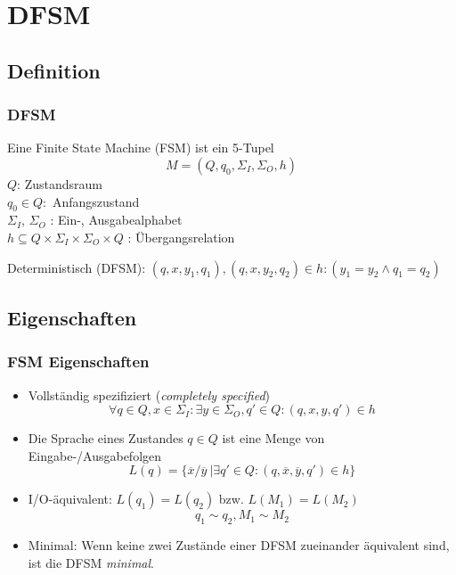 \section{DFSM}
\subsection{Definition}
\begin{frame}
  \frametitle{DFSM}

  \begin{definition}
    Eine Finite State Machine (FSM) ist ein 5-Tupel $$M=(Q,q_0,\Sigma_I,\Sigma_O,h)$$
    $Q$: Zustandsraum\\
    $q_0\in Q:$ Anfangszustand\\
    $\Sigma_I$, $\Sigma_O$ : Ein-, Ausgabealphabet\\
    $h \subseteq Q \times \Sigma_I \times \Sigma_O \times Q$ : Übergangsrelation 
  \end{definition}
  Deterministisch (DFSM): $(q,x,y_1,q_1),(q,x,y_2,q_2) \in h: (y_1 = y_2 \wedge q_1 = q_2)$
\end{frame}

\subsection{Eigenschaften}
\begin{frame}
\frametitle{FSM Eigenschaften}
\begin{itemize}
  \item Vollständig spezifiziert (\emph{completely specified})$$\forall q\in Q, x\in \Sigma_I : \exists y \in \Sigma_O, q'\in Q : (q,x,y,q')\in h$$
  \item Die Sprache eines Zustandes $q \in Q$ ist eine Menge von Eingabe-/Aus\-gabefolgen $$L(q)= \{\overline{x}/\overline{y}\ | \exists q' \in Q : (q,\overline{x}, \overline{y}, q') \in h \}$$
  \item I/O-äquivalent: $L(q_1) = L(q_2)$ bzw. $L(M_1) = L(M_2)$ $$q_1 \sim q_2, M_1 \sim M_2$$
  \item Minimal: Wenn keine zwei Zustände einer DFSM zueinander äquivalent sind, ist die DFSM \emph{minimal}.
\end{itemize}
\end{frame}